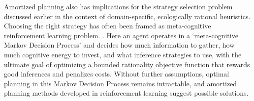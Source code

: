 Amortized planning also has implications for the strategy selection problem discussed earlier in the context of domain-specific, ecologically rational heuristics. Choosing the right strategy has often been framed as meta-cognitive reinforcement learning problem. \cite{erev2005adaptation, rieskamp2006ssl, lieder2017strategy}. Here an agent operates in a `meta-cognitive Markov Decision Process' and decides how much information to gather, how much cognitive energy to invest, and what inference strategies to use, with the ultimate goal of optimizing a bounded rationality objective function that rewards good inferences and penalizes costs. Without further assumptions, optimal planning in this Markov Decision Process remains intractable, and amortized planning methods developed in reinforcement learning suggest possible solutions.



